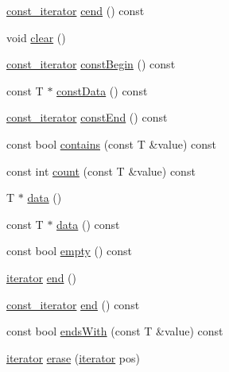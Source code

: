 \begin{DoxyCompactItemize}
\item 
\hyperlink{classprism_1_1_vector_acc6ed07e2d7ed5065feec92a83e46fa4}{const\+\_\+iterator} \hyperlink{classprism_1_1_vector_a3ac39de85562660281a0fd7601ef203b}{cend} () const 
\item 
void \hyperlink{classprism_1_1_vector_acb8a681b958856d257b145930014c6fa}{clear} ()
\item 
\hyperlink{classprism_1_1_vector_acc6ed07e2d7ed5065feec92a83e46fa4}{const\+\_\+iterator} \hyperlink{classprism_1_1_vector_a6d03b3bb9cc1292e1698674080ff3334}{const\+Begin} () const 
\item 
const T $\ast$ \hyperlink{classprism_1_1_vector_a6e6fee098958130862af58cafeb27d65}{const\+Data} () const 
\item 
\hyperlink{classprism_1_1_vector_acc6ed07e2d7ed5065feec92a83e46fa4}{const\+\_\+iterator} \hyperlink{classprism_1_1_vector_a99331f9557172b3e3e34fb36f23e5cc5}{const\+End} () const 
\item 
const bool \hyperlink{classprism_1_1_vector_a6b21bf92cde4f91cb8d14efb4e315ea0}{contains} (const T \&value) const 
\item 
const int \hyperlink{classprism_1_1_vector_ad40e1dc908502680797f37312dda7a4f}{count} (const T \&value) const 
\item 
T $\ast$ \hyperlink{classprism_1_1_vector_a0da05f1f73ce9b35f3837bb7fca4a81e}{data} ()
\item 
const T $\ast$ \hyperlink{classprism_1_1_vector_a148789766065acd9338e8e6d4dcbdd2d}{data} () const 
\item 
const bool \hyperlink{classprism_1_1_vector_ad710950cfeaaf977ef629e69fc39b5a7}{empty} () const 
\item 
\hyperlink{classprism_1_1_vector_aa547779173a63f6f8c9b2887498d10eb}{iterator} \hyperlink{classprism_1_1_vector_a329f8549c259232b232e8f361bc4bcb1}{end} ()
\item 
\hyperlink{classprism_1_1_vector_acc6ed07e2d7ed5065feec92a83e46fa4}{const\+\_\+iterator} \hyperlink{classprism_1_1_vector_a0a5a10cd6cd6790d2b3e2546af742fc9}{end} () const 
\item 
const bool \hyperlink{classprism_1_1_vector_ae214a9cce9ac8cc215893eee20fd0e44}{ends\+With} (const T \&value) const 
\item 
\hyperlink{classprism_1_1_vector_aa547779173a63f6f8c9b2887498d10eb}{iterator} \hyperlink{classprism_1_1_vector_a540d12132c9a971d469c9d53a954f322}{erase} (\hyperlink{classprism_1_1_vector_aa547779173a63f6f8c9b2887498d10eb}{iterator} pos)
\item 

\end{DoxyCompactItemize}
